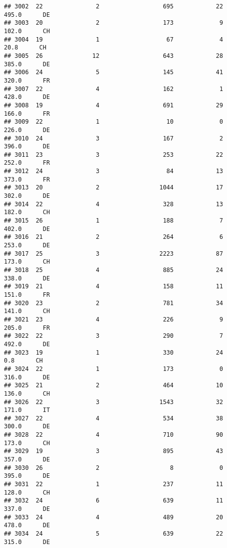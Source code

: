 \documentclass[
]{article}
\begin{document}
\begin{verbatim}
## 3002  22               2                  695            22    495.0      DE
## 3003  20               2                  173             9    102.0      CH
## 3004  19               1                   67             4     20.8      CH
## 3005  26              12                  643            28    385.0      DE
## 3006  24               5                  145            41    320.0      FR
## 3007  22               4                  162             1    428.0      DE
## 3008  19               4                  691            29    166.0      FR
## 3009  22               1                   10             0    226.0      DE
## 3010  24               3                  167             2    396.0      DE
## 3011  23               3                  253            22    252.0      FR
## 3012  24               3                   84            13    373.0      FR
## 3013  20               2                 1044            17    302.0      DE
## 3014  22               4                  328            13    182.0      CH
## 3015  26               1                  188             7    402.0      DE
## 3016  21               2                  264             6    253.0      DE
## 3017  25               3                 2223            87    173.0      CH
## 3018  25               4                  885            24    338.0      DE
## 3019  21               4                  158            11    151.0      FR
## 3020  23               2                  781            34    141.0      CH
## 3021  23               4                  226             9    205.0      FR
## 3022  22               3                  290             7    492.0      DE
## 3023  19               1                  330            24      0.8      CH
## 3024  22               1                  173             0    316.0      DE
## 3025  21               2                  464            10    136.0      CH
## 3026  22               3                 1543            32    171.0      IT
## 3027  22               4                  534            38    300.0      DE
## 3028  22               4                  710            90    173.0      CH
## 3029  19               3                  895            43    357.0      DE
## 3030  26               2                    8             0    395.0      DE
## 3031  22               1                  237            11    128.0      CH
## 3032  24               6                  639            11    337.0      DE
## 3033  24               4                  489            20    478.0      DE
## 3034  24               5                  639            22    315.0      DE

\end{verbatim}
\end{document}
